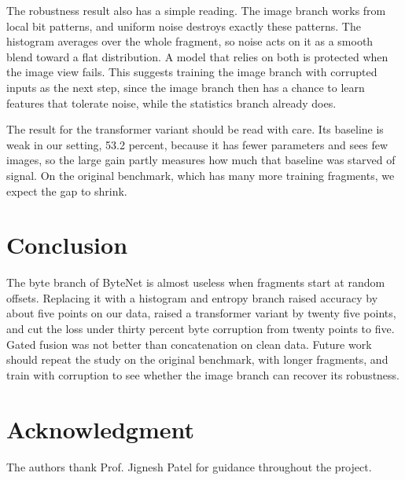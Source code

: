 \documentclass[journal]{IEEEtran}
\begin{document}
The robustness result also has a simple reading. The image branch works from local bit patterns, and uniform noise destroys exactly these patterns. The histogram averages over the whole fragment, so noise acts on it as a smooth blend toward a flat distribution. A model that relies on both is protected when the image view fails. This suggests training the image branch with corrupted inputs as the next step, since the image branch then has a chance to learn features that tolerate noise, while the statistics branch already does.

The result for the transformer variant should be read with care. Its baseline is weak in our setting, 53.2 percent, because it has fewer parameters and sees few images, so the large gain partly measures how much that baseline was starved of signal. On the original benchmark, which has many more training fragments, we expect the gap to shrink.

\section{Conclusion}
The byte branch of ByteNet is almost useless when fragments start at random offsets. Replacing it with a histogram and entropy branch raised accuracy by about five points on our data, raised a transformer variant by twenty five points, and cut the loss under thirty percent byte corruption from twenty points to five. Gated fusion was not better than concatenation on clean data. Future work should repeat the study on the original benchmark, with longer fragments, and train with corruption to see whether the image branch can recover its robustness.

\section*{Acknowledgment}
The authors thank Prof. Jignesh Patel for guidance throughout the project.
\end{document}
